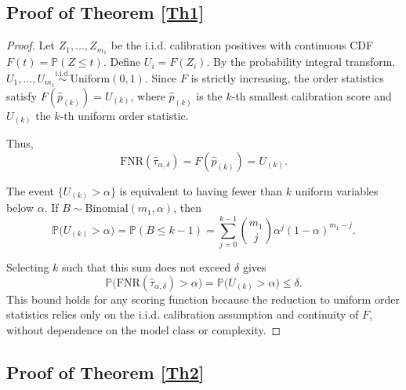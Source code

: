 \documentclass[journal,twoside,web]{ieeecolor}
\begin{document}
\subsection{Proof of Theorem \ref{Th1}}\label{S6-1}

\begin{proof}
Let $Z_1, \dots, Z_{m_1}$ be the i.i.d. calibration positives with continuous CDF $F(t) = \mathbb{P}(Z \leq t)$. 
Define $U_i = F(Z_i)$. 
By the probability integral transform, $U_1, \dots, U_{m_1} \stackrel{\text{i.i.d.}}{\sim} \mathrm{Uniform}(0,1)$. 
Since $F$ is strictly increasing, the order statistics satisfy $F(\hat{p}_{(k)}) = U_{(k)}$, where $\hat{p}_{(k)}$ is the $k$-th smallest calibration score and $U_{(k)}$ the $k$-th uniform order statistic.  

Thus,
\[
\mathrm{FNR}(\hat{\tau}_{\alpha,\delta}) = F(\hat{p}_{(k)}) = U_{(k)}.
\]

The event $\{U_{(k)} > \alpha\}$ is equivalent to having fewer than $k$ uniform variables below $\alpha$. 
If $B \sim \mathrm{Binomial}(m_1, \alpha)$, then
\[
\mathbb{P}\bigl(U_{(k)} > \alpha\bigr) 
= \mathbb{P}(B \le k-1) 
= \sum_{j=0}^{k-1} \binom{m_1}{j} \alpha^j (1-\alpha)^{m_1-j}.
\]

Selecting $k$ such that this sum does not exceed $\delta$ gives
\[
\mathbb{P}\bigl(\mathrm{FNR}(\hat{\tau}_{\alpha,\delta}) > \alpha\bigr) = \mathbb{P}\bigl(U_{(k)} > \alpha\bigr) \le \delta.
\]
This bound holds for any scoring function because the reduction to uniform order statistics relies only on the i.i.d. calibration assumption and continuity of $F$, without dependence on the model class or complexity.
\end{proof}

\subsection{Proof of Theorem \ref{Th2}}\label{S6-2}
\end{document}
